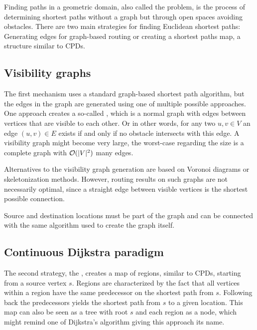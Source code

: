 	Finding paths in a geometric domain, also called the  problem, is the process of determining shortest paths without a graph but through open spaces avoiding obstacles.
	There are two main strategies for finding Euclidean shortest paths:
	Generating edges for graph-based routing or creating a shortest paths map, a structure similar to CPDs.
	
	\subsection{Visibility graphs}
	\label{subsec:visibility-graph}
	
		The first mechanism uses a standard graph-based shortest path algorithm, but the edges in the graph are generated using one of multiple possible approaches.
		One approach creates a so-called , which is a normal graph with edges between vertices that are visible to each other.
		Or in other words, for any two $u, v \in V$ an edge $(u, v) \in E$ exists if and only if no obstacle intersects with this edge.
		A visibility graph might become very large, the worst-case regarding the size is a complete graph with $\mathcal{O}(|V|^2)$ many edges.
		
		Alternatives to the visibility graph generation are based on Voronoi diagrams or skeletonization methods.
		However, routing results on such graphs are not necessarily optimal\cite{graser-osm-open-spaces}, since a straight edge between visible vertices is the shortest possible connection.
		
		Source and destination locations must be part of the graph and can be connected with the same algorithm used to create the graph itself.
	
	\subsection{Continuous Dijkstra paradigm}
	\label{subsec:continuous-dijkstra}
	
		The second strategy, the , creates a map of regions, similar to CPDs, starting from a source vertex $s$.
		Regions are characterized by the fact that all vertices within a region have the same predecessor on the shortest path from $s$.
		Following back the predecessors yields the shortest path from $s$ to a given location.
		This map can also be seen as a tree with root $s$ and each region as a node, which might remind one of Dijkstra's algorithm giving this approach its name\cite{mitchell-discrete-geodesic}.
		
